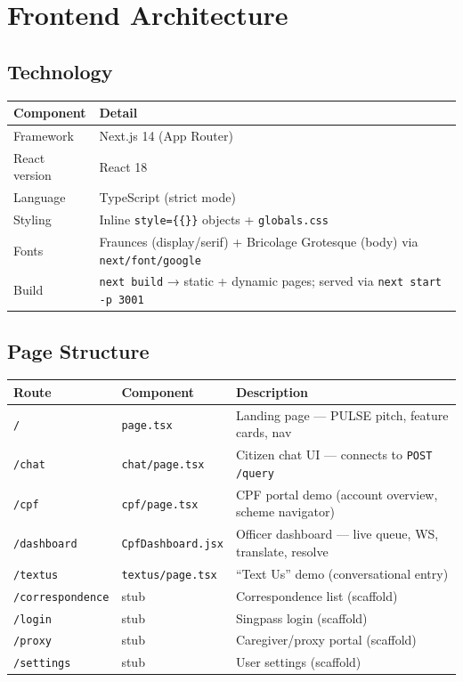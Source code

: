 \documentclass[12pt,a4paper]{article}
\begin{document}
\section{Frontend Architecture}
\label{sec:frontend}

\subsection{Technology}

\begin{tabular}{@{}ll@{}}
\toprule
\textbf{Component} & \textbf{Detail} \\
\midrule
Framework       & Next.js 14 (App Router) \\
React version   & React 18 \\
Language        & TypeScript (strict mode) \\
Styling         & Inline \texttt{style=\{\{\}\}} objects + \texttt{globals.css} \\
Fonts           & Fraunces (display/serif) + Bricolage Grotesque (body) via \texttt{next/font/google} \\
Build           & \texttt{next build} → static + dynamic pages; served via \texttt{next start -p 3001} \\
\bottomrule
\end{tabular}

\subsection{Page Structure}

\begin{tabular}{@{}lll@{}}
\toprule
\textbf{Route} & \textbf{Component} & \textbf{Description} \\
\midrule
\texttt{/}               & \texttt{page.tsx}        & Landing page — PULSE pitch, feature cards, nav \\
\texttt{/chat}           & \texttt{chat/page.tsx}   & Citizen chat UI — connects to \texttt{POST /query} \\
\texttt{/cpf}            & \texttt{cpf/page.tsx}    & CPF portal demo (account overview, scheme navigator) \\
\texttt{/dashboard}      & \texttt{CpfDashboard.jsx} & Officer dashboard — live queue, WS, translate, resolve \\
\texttt{/textus}         & \texttt{textus/page.tsx}  & ``Text Us'' demo (conversational entry) \\
\texttt{/correspondence} & stub                     & Correspondence list (scaffold) \\
\texttt{/login}          & stub                     & Singpass login (scaffold) \\
\texttt{/proxy}          & stub                     & Caregiver/proxy portal (scaffold) \\
\texttt{/settings}       & stub                     & User settings (scaffold) \\
\bottomrule
\end{tabular}
\end{document}
